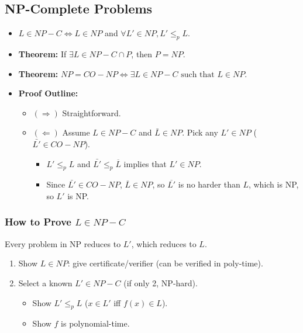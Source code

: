 \subsection{NP-Complete Problems}
\begin{definition}
    \begin{itemize}
        \item $L \in NP-C \iff L \in NP$ and $\forall L' \in NP, L' \leq_p L$.
        \item \textbf{Theorem:} If $\exists L \in NP-C \cap P$, then $P = NP$.
        \item \textbf{Theorem:} $NP = CO-NP \iff \exists L \in NP-C \text{ such that } L \in NP$.
        \item \textbf{Proof Outline:}
        \begin{itemize}
            \item $(\Rightarrow)$ Straightforward.
            \item $(\Leftarrow)$ Assume $L \in NP-C$ and $\bar{L} \in NP$. Pick any $L' \in NP$ ($\bar{L'} \in CO-NP$).
            \begin{itemize}
                \item $L' \leq_p L$ and $\bar{L'} \leq_p \overline{L}$ implies that $L' \in NP$.
                \item Since $\bar{L'} \in CO-NP$, $\overline{L} \in NP$, so $\overline{L'}$ is no harder than $L$, which is NP, so $L'$ is NP.
            \end{itemize}
        \end{itemize}
    \end{itemize}
\end{definition}

\subsubsection{How to Prove $L \in NP-C$}
\begin{process} Every problem in NP reduces to $L'$, which reduces to $L$.
    \begin{enumerate}
        \item Show $L \in NP$: give certificate/verifier (can be verified in poly-time).
        \item Select a known $L' \in NP-C$ (if only 2, NP-hard).
        \begin{itemize}
            \item Show $L' \leq_p L$ ($x \in L'$ iff $f(x) \in L$).
            \item Show $f$ is polynomial-time.
        \end{itemize}
    \end{enumerate}
\end{process}

